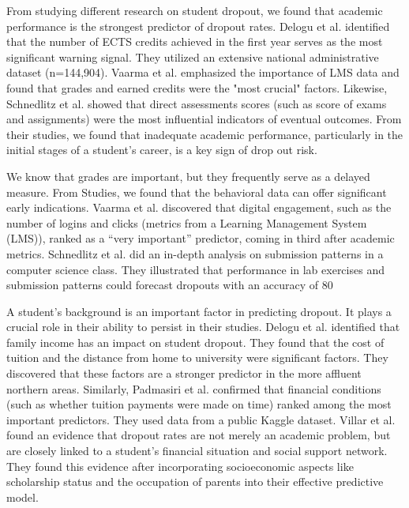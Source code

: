 \documentclass[journal]{IEEEtran}
\begin{document}
From studying different research on student dropout, we found that academic performance is the strongest predictor of dropout rates. Delogu et al. \cite{delogu2024predicting} identified that the number of ECTS credits achieved in the first year serves as the most significant warning signal. They utilized an extensive national administrative dataset (n=144,904).
Vaarma et al. \cite{vaarma2024predicting} emphasized the importance of LMS data and found that grades and earned credits were the "most crucial" factors. Likewise, Schnedlitz et al. \cite{schnedlitz2025complete} showed that direct assessments scores (such as score of exams and assignments) were the most influential indicators of eventual outcomes. From their studies, we found that inadequate academic performance, particularly in the initial stages of a student's career, is a key sign of drop out risk.

We know that grades are important, but they frequently serve as a delayed measure. From Studies, we found that the behavioral data can offer significant early indications. Vaarma et al. \cite{vaarma2024predicting} discovered that digital engagement, such as the number of logins and clicks (metrics from a Learning Management System (LMS)), ranked as a “very important” predictor, coming in third after academic metrics. Schnedlitz et al. \cite{schnedlitz2025complete} did an in-depth analysis on submission patterns in a computer science class. They illustrated that performance in lab exercises and submission patterns could forecast dropouts with an accuracy of 80%

A student’s background is an important factor in predicting dropout. It plays a crucial role in their ability to persist in their studies. Delogu et al. \cite{delogu2024predicting} identified that family income has an impact on student dropout. They found that the cost of tuition and the distance from home to university were significant factors. They discovered that these factors are a stronger predictor in the more affluent northern areas. Similarly, Padmasiri et al. \cite{padmasiri2024interpretable} confirmed that financial conditions (such as whether tuition payments were made on time) ranked among the most important predictors. They used data from a public Kaggle dataset. Villar et al. \cite{villar2024supervised} found an evidence that dropout rates are not merely an academic problem, but are closely linked to a student’s financial situation and social support network. They found this evidence after incorporating socioeconomic aspects like scholarship status and the occupation of parents into their effective predictive model.
\end{document}
